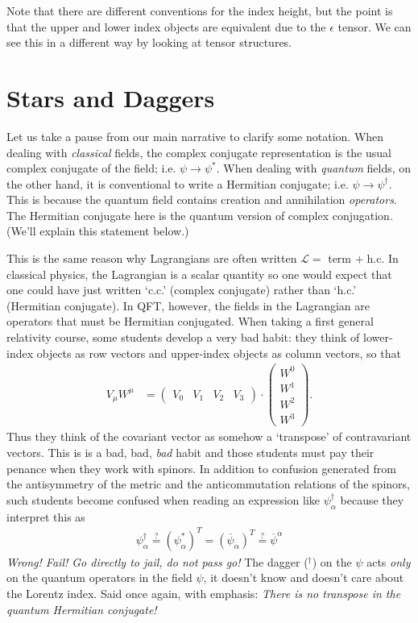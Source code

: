 \documentclass[12pt]{article}
\numberwithin{equation}{section}    %
\begin{document}
Note that there are different conventions for the index height, but the point is that the upper and lower index objects are equivalent due to the $\epsilon$ tensor. We can see this in a different way by looking at tensor structures. %

\section{Stars and Daggers}\label{sec:SUSYalg:starsanddaggers}


Let us take a pause from our main narrative to clarify some notation. When dealing with \textit{classical} fields, the complex conjugate representation is the usual complex conjugate of the field; i.e. $\psi \rightarrow \psi^*$. When dealing with \textit{quantum} fields, on the other hand, it is conventional to write a Hermitian conjugate; i.e. $\psi \rightarrow \psi^\dag$. This is because the quantum field contains creation and annihilation \textit{operators}. The Hermitian conjugate here is the quantum version of complex conjugation. (We'll explain this statement below.)

This is the same reason why Lagrangians are often written $\mathcal L =$ term $+\; \text{h.c.}$ 
%
In classical physics, the Lagrangian is a scalar quantity so one would expect that one could have just written `c.c.' (complex conjugate) rather than `h.c.' (Hermitian conjugate). In QFT, however, the fields in the Lagrangian are operators that must be Hermitian conjugated.
 When taking a first general relativity course, some students develop a very bad habit: they think of lower-index objects as row vectors and upper-index objects as column vectors, so that
\begin{align}
	V_\mu W^\mu &= \begin{pmatrix}
		V_0 & V_1 & V_2 & V_3
	\end{pmatrix}\cdot
	\begin{pmatrix}
		W^0 \\ W^1 \\ W^2 \\ W^3
	\end{pmatrix}.
\end{align}
Thus they think of the covariant vector as somehow a `transpose' of contravariant vectors. This is is a bad, bad, \textit{bad} habit and those students must pay their penance when they work with spinors. In addition to confusion generated from the antisymmetry of the metric and the anticommutation relations of the spinors, such students become confused when reading an expression like $\psi_\alpha^\dag$ because they interpret this as 
\begin{align}
	\psi_\alpha^\dag \stackrel{?}{=} (\psi_\alpha^*)^T = (\overline\psi_{\dot\alpha})^T \stackrel{?}{=} \overline\psi^{\dot\alpha}
\end{align}
\textit{Wrong! Fail! Go directly to jail, do not pass go!}
The dagger ($^\dag$) on the $\psi$ acts \textit{only} on the quantum operators in the field $\psi$, it doesn't know and doesn't care about the Lorentz index. Said once again, with emphasis: \textit{There is no transpose in the quantum Hermitian conjugate!}
\end{document}
